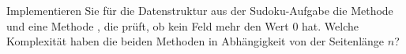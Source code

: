 Implementieren Sie für die Datenstruktur aus der Sudoku-Aufgabe die Methode  und eine Methode , die prüft, ob kein Feld mehr den Wert 0 hat. Welche Komplexität haben die beiden Methoden in Abhängigkeit von der Seitenlänge $n$?
